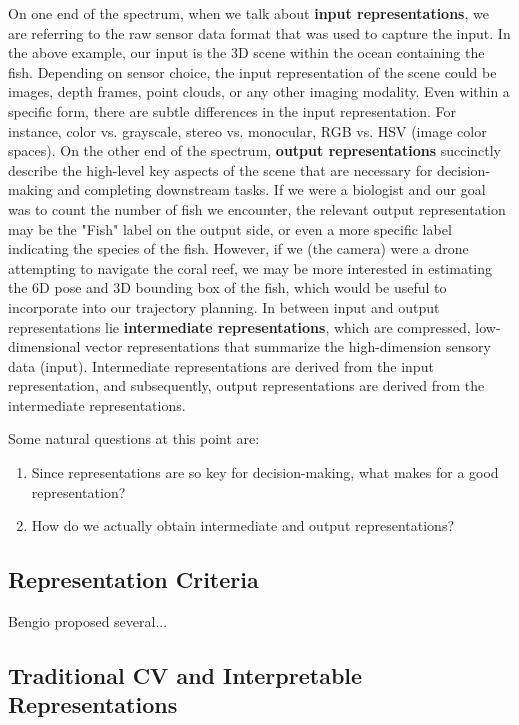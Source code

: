 \documentclass[12pt]{article}
\begin{document}
On one end of the spectrum, when we talk about \textbf{input representations}, we are referring to the raw sensor data format that was used to capture the input. In the above example, our input is the 3D scene within the ocean containing the fish. Depending on sensor choice, the input representation of the scene could be images, depth frames, point clouds, or any other imaging modality. Even within a specific form, there are subtle differences in the input representation. For instance, color vs. grayscale, stereo vs. monocular, RGB vs. HSV (image color spaces). On the other end of the spectrum, \textbf{output representations} succinctly describe the high-level key aspects of the scene that are necessary for decision-making and completing downstream tasks. If we were a biologist and our goal was to count the number of fish we encounter, the relevant output representation may be the "Fish" label on the output side, or even a more specific label indicating the species of the fish. However, if we (the camera) were a drone attempting to navigate the coral reef, we may be more interested in estimating the 6D pose and 3D bounding box of the fish, which would be useful to incorporate into our trajectory planning. In between input and output representations lie \textbf{intermediate representations}, which are compressed, low-dimensional vector representations that summarize the high-dimension sensory data (input). Intermediate representations are derived from the input representation, and subsequently, output representations are derived from the intermediate representations. 

Some natural questions at this point are:

\begin{enumerate}[]
  \item Since representations are so key for decision-making, what makes for a good representation? 
  \item How do we actually obtain intermediate and output representations?
\end{enumerate}

\subsection*{Representation Criteria}

Bengio proposed several...

\subsection*{Traditional CV and Interpretable Representations} 
\end{document}
